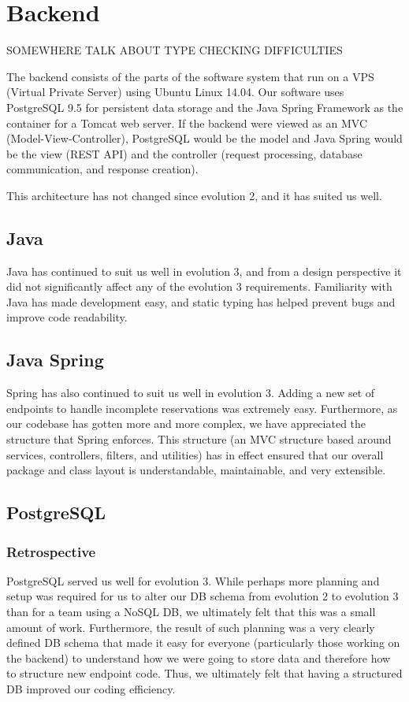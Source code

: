 \documentclass[12pt]{article}
\begin{document}
\section{Backend}
{\huge SOMEWHERE TALK ABOUT TYPE CHECKING DIFFICULTIES}

\label{sec:Backend}
The backend consists of the parts of the software system that run on a VPS (Virtual Private Server) using Ubuntu Linux 14.04. Our software uses PostgreSQL 9.5 for persistent data storage and the Java Spring Framework as the container for a Tomcat web server. If the backend were viewed as an MVC (Model-View-Controller), PostgreSQL would be the model and Java Spring would be the view (REST API) and the controller (request processing, database communication, and response creation). 

This architecture has not changed since evolution 2, and it has suited us well. 

\subsection{Java}
Java has continued to suit us well in evolution 3, and from a design perspective it did not significantly affect any of the evolution 3 requirements. Familiarity with Java has made development easy, and static typing has helped prevent bugs and improve code readability.

\subsection{Java Spring}
Spring has also continued to suit us well in evolution 3. Adding a new set of endpoints to handle incomplete reservations was extremely easy. Furthermore, as our codebase has gotten more and more complex, we have appreciated the structure that Spring enforces. This structure (an MVC structure based around services, controllers, filters, and utilities) has in effect ensured that our overall package and class layout is understandable, maintainable, and very extensible. 

\subsection{PostgreSQL}
\subsubsection{Retrospective}
PostgreSQL served us well for evolution 3. While perhaps more planning and setup was required for us to alter our DB schema from evolution 2 to evolution 3 than for a team using a NoSQL DB, we ultimately felt that this was a small amount of work. Furthermore, the result of such planning was a very clearly defined DB schema that made it easy for everyone (particularly those working on the backend) to understand how we were going to store data and therefore how to structure new endpoint code. Thus, we ultimately felt that having a structured DB improved our coding efficiency. 
\end{document}
